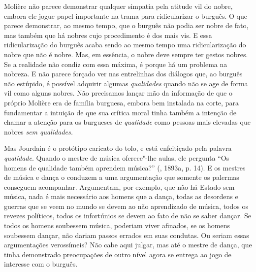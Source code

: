 Molière não parece demonstrar qualquer simpatia pela atitude vil do
nobre, embora ele jogue papel importante na trama para ridicularizar o
burguês. O que parece demonstrar, ao mesmo tempo, que o burguês não
podia ser nobre de fato, mas também que há nobres cujo procedimento é
dos mais vis. E essa ridicularização do burguês acaba sendo ao mesmo
tempo uma ridicularização do nobre que não é nobre. Mas, em essência, o
nobre deve sempre ter gestos nobres. Se a realidade não condiz com essa
máxima, é porque há um problema na nobreza. E não parece forçado ver nas
entrelinhas dos diálogos que, ao burguês não estúpido, é possível
adquirir algumas \emph{qualidades} quando não se age de forma vil como alguns nobres. Não
precisamos lançar mão da informação de que o próprio Molière era de
família burguesa, embora bem instalada na corte, para fundamentar a
intuição de que sua crítica moral tinha também a intenção de chamar a
atenção para os burgueses de \emph{qualidade} como pessoas mais elevadas
que nobres \emph{sem qualidades.}

Mas Jourdain é o protótipo caricato do tolo, e está enfeitiçado pela
palavra \emph{qualidade}. Quando o mestre de música oferece"-lhe aulas,
ele pergunta ``Os homens de qualidade também aprendem música?''
(, 1893a, p. 14). E os mestres de música e dança o conduzem a uma
argumentação que somente os palermas conseguem acompanhar. Argumentam,
por exemplo, que não há Estado sem música, nada é mais necessário aos
homens que a dança, todas as desordens e guerras que se veem no mundo se
devem ao não aprendizado de música, todos os revezes políticos, todos os
infortúnios se devem ao fato de não se saber dançar. Se todos os homens
soubessem música, poderiam viver afinados, se os homens soubessem
dançar, não dariam passos errados em suas condutas. Ou seriam essas
argumentações verossímeis? Não cabe aqui julgar, mas até o mestre de
dança, que tinha demonstrado preocupações de outro nível agora se
entrega ao jogo de interesse com o burguês.

